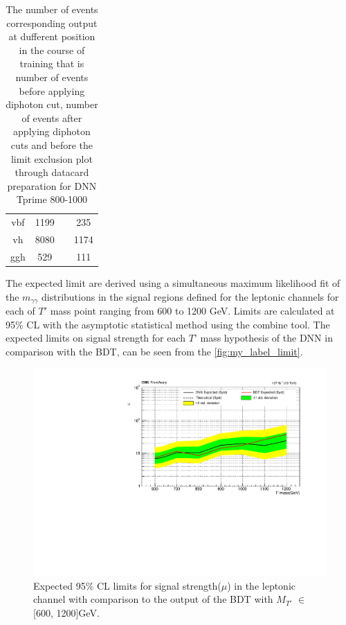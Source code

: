 \begin{table}[h]
{\begin{tabular}{|cccc|}
       vbf        &     1199      &         &    235      \\
        vh              &   8080        &         &    1174      \\        
        ggh       &    529       &         &      111    \\ \hline
    \end{tabular}}
    \caption{The number of events corresponding output at dufferent position in the course of training that is number of events before applying diphoton cut, number of events after applying diphoton cuts and before the limit exclusion plot through datacard preparation for DNN Tprime 800-1000}
    \label{tab:my_label_table_11}
\end{table}













The expected limit are derived using a simultaneous maximum likelihood fit of the $m_{\gamma\gamma}$ distributions in the signal regions defined for the leptonic channels for each of $T'$ mass point ranging from 600 to 1200 GeV. Limits are calculated at 95\% CL with the asymptotic statistical method using the combine tool. The expected limits on signal strength for each $T’$ mass hypothesis of the DNN in comparison with the BDT, can be seen  from the \autoref{fig:my_label_limit}. 

\begin{figure}[H]
    \centering
    \includegraphics[scale=0.8]{figure_4/muALL_Plot_600-1200_ .pdf}
    \caption{Expected 95\% CL limits for signal strength($\mu$) in the leptonic channel with comparison to the output of the BDT with $M_{T'}$ $\in$ [600, 1200]GeV.}
    \label{fig:my_label_limit}
\end{figure}

